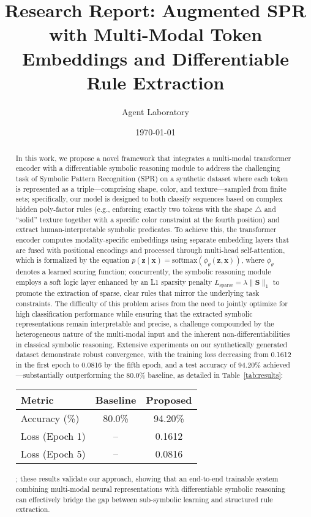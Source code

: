 \documentclass{article}
\title{Research Report: Augmented SPR with Multi-Modal Token Embeddings and Differentiable Rule Extraction}
\author{Agent Laboratory}
\date{\today}
\begin{document}
\maketitle

\begin{abstract}
In this work, we propose a novel framework that integrates a multi-modal transformer encoder with a differentiable symbolic reasoning module to address the challenging task of Symbolic Pattern Recognition (SPR) on a synthetic dataset where each token is represented as a triple—comprising shape, color, and texture—sampled from finite sets; specifically, our model is designed to both classify sequences based on complex hidden poly-factor rules (e.g., enforcing exactly two tokens with the shape \(\triangle\) and “solid” texture together with a specific color constraint at the fourth position) and extract human-interpretable symbolic predicates. To achieve this, the transformer encoder computes modality-specific embeddings using separate embedding layers that are fused with positional encodings and processed through multi-head self-attention, which is formalized by the equation \(p(\mathbf{z}\mid\mathbf{x}) = \mathrm{softmax}(\phi_\theta(\mathbf{z},\mathbf{x}))\), where \(\phi_\theta\) denotes a learned scoring function; concurrently, the symbolic reasoning module employs a soft logic layer enhanced by an L1 sparsity penalty \(L_{\text{sparse}} = \lambda \|\mathbf{S}\|_1\) to promote the extraction of sparse, clear rules that mirror the underlying task constraints. The difficulty of this problem arises from the need to jointly optimize for high classification performance while ensuring that the extracted symbolic representations remain interpretable and precise, a challenge compounded by the heterogeneous nature of the multi-modal input and the inherent non-differentiabilities in classical symbolic reasoning. Extensive experiments on our synthetically generated dataset demonstrate robust convergence, with the training loss decreasing from 0.1612 in the first epoch to 0.0816 by the fifth epoch, and a test accuracy of 94.20\% achieved—substantially outperforming the 80.0\% baseline, as detailed in Table~\ref{tab:results}: \begin{tabular}{lcc} \hline Metric & Baseline & Proposed \\ \hline Accuracy (\%) & 80.0\% & 94.20\% \\ Loss (Epoch 1) & -- & 0.1612 \\ Loss (Epoch 5) & -- & 0.0816 \\ \hline \end{tabular}; these results validate our approach, showing that an end-to-end trainable system combining multi-modal neural representations with differentiable symbolic reasoning can effectively bridge the gap between sub-symbolic learning and structured rule extraction.
\end{abstract}
\end{document}
